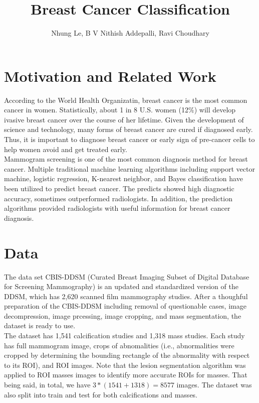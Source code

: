 \documentclass[ruled]{article}
\begin{document}
\title{Breast Cancer Classification}
\author{Nhung Le, B V Nithish Addepalli, Ravi Choudhary}

\maketitle

\section{Motivation and Related Work}

According to the World Health Organizatin, breast cancer is the most common cancer in women. Statistically, about 1 in 8 U.S. women (12$\%$) will develop ivasive breast cancer over the course of her lifetime. Given the development of science and technology, many forms of breast cancer are cured if diagnosed early. Thus, it is important to diagnose breast cancer or early sign of pre-cancer cells to help women avoid and get treated early. \\ 
 
Mammogram screening is one of the most common diagnosis method for breast cancer. Multiple traditional machine learning algorithms including support vector machine, logistic regression, K-nearest neighbor, and Bayes classification have been utilized to predict breast cancer. The predicts showed high diagnostic accuracy, sometimes outperformed radiologists. In addition, the prediction algorithms provided radiologists with useful information for breast cancer diagnosis. \\

\section{Data}

The data set CBIS-DDSM (Curated Breast Imaging Subset of Digital Database for Screening Mammography) is an updated and standardized version of the DDSM, which has 2,620 scanned film mammography studies. After a thoughful preparation of the CBIS-DDSM including removal of questionable cases, image decompression, image prcessing, image cropping, and mass segmentation, the dataset is ready to use.\\

The dataset has 1,541 calcification studies and 1,318 mass studies. Each study has full mammogram image, crops of abnomalities (i.e., abnormalities were cropped by determining the bounding rectangle of the abnormality with respect to its ROI), and ROI images. Note that the lesion segmentation algorithm was applied to ROI masses images to identify more accurate ROIs for masses.  That being said, in total, we have $ 3 * (1541 + 1318) = 8577 $ images. The dataset was also split into train and test for both calcifications and masses. \\
\end{document}
